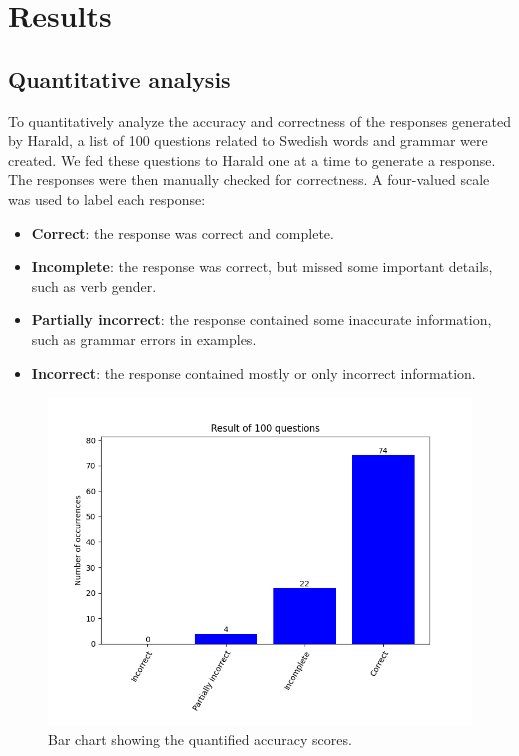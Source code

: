 \documentclass[a4paper,10pt]{article}
\begin{document}
\section{Results}

\subsection{Quantitative analysis}

To quantitatively analyze the accuracy and correctness of the responses generated by Harald, a list of 100 questions related to Swedish words and grammar were created. We fed these questions to Harald one at a time to generate a response. The responses were then manually checked for correctness. A four-valued scale was used to label each response:

\begin{itemize}
    \item \textbf{Correct}: the response was correct and complete.
    \item \textbf{Incomplete}: the response was correct, but missed some important details, such as verb gender.
    \item \textbf{Partially incorrect}: the response contained some inaccurate information, such as grammar errors in examples.
    \item \textbf{Incorrect}: the response contained mostly or only incorrect information.
\end{itemize}

\begin{figure}[htbp]
    \centering
    \includegraphics[width=0.8\linewidth]{quant_results.png} %
    \caption{Bar chart showing the quantified accuracy scores.}
    \label{fig:quant_results}
\end{figure}
\end{document}
